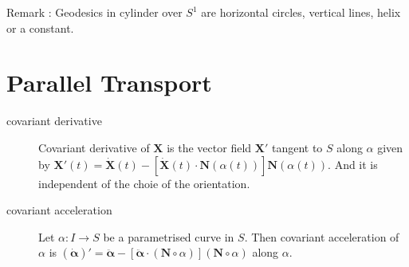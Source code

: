 Remark :  Geodesics in cylinder over $S^1$ are horizontal circles, vertical lines, helix or a constant. 

\section{Parallel Transport}
\begin{description}
	\item[covariant derivative] Covariant derivative of $\boldsymbol{X}$ is the vector field $\boldsymbol{X}'$ tangent to $S$ along $\alpha$ given by $\boldsymbol{X}'(t) = \dot{\boldsymbol{X}}(t) - [\dot{\boldsymbol{X}}(t) \cdot \boldsymbol{N}(\alpha(t))]\boldsymbol{N}(\alpha(t))$.
		And it is independent of the choie of the orientation.
	\item[covariant acceleration] Let $\alpha : I \to S$ be a parametrised curve in $S$.
		Then covariant acceleration of $\alpha$ is $(\dot{\boldsymbol{\alpha}})' = \ddot{\boldsymbol{\alpha}} - \left[ \ddot{\boldsymbol{\alpha}} \cdot (\boldsymbol{N} \circ \alpha) \right] (\boldsymbol{N} \circ \alpha)$ along $\alpha$.
\end{description}
